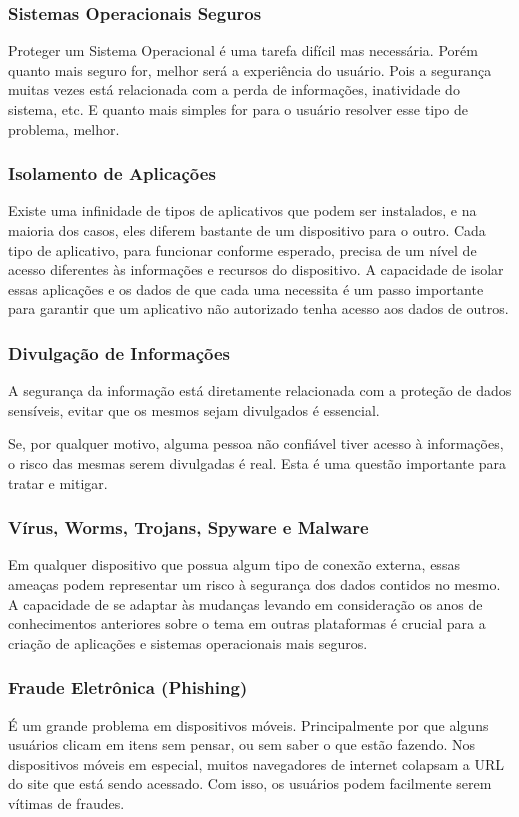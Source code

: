 \subsubsection{Sistemas Operacionais Seguros}
Proteger um Sistema Operacional é uma tarefa difícil mas necessária. Porém quanto mais seguro for, melhor será a experiência do usuário. Pois a segurança muitas vezes está relacionada com a perda de informações, inatividade do sistema, etc. E quanto mais simples for para o usuário resolver esse tipo de problema, melhor. \cite{DWIVEDI}

\subsubsection{ Isolamento de Aplicações}
Existe uma infinidade de tipos de aplicativos que podem ser instalados, e na maioria dos casos, eles diferem bastante de um dispositivo para o outro. Cada tipo de aplicativo, para funcionar conforme esperado, precisa de um nível de acesso diferentes às informações e recursos do dispositivo. A capacidade de isolar essas aplicações e os dados de que cada uma necessita é um passo importante para garantir que um aplicativo não autorizado tenha acesso aos dados de outros. \cite{DWIVEDI}

\subsubsection{Divulgação de Informações}
A segurança da informação está diretamente relacionada com a proteção de dados sensíveis, evitar que os mesmos sejam divulgados é essencial. 

Se, por qualquer motivo, alguma pessoa não confiável tiver acesso à informações, o risco das mesmas serem divulgadas é real. Esta é uma questão importante para tratar e mitigar. \cite{DWIVEDI} 

\subsubsection{Vírus, Worms, Trojans, Spyware e Malware}
Em qualquer dispositivo que possua algum tipo de conexão externa, essas ameaças podem representar um risco à segurança dos dados contidos no mesmo. A capacidade de se adaptar às mudanças levando em consideração os anos de conhecimentos anteriores sobre o tema em outras plataformas é crucial para a criação de aplicações e sistemas operacionais mais seguros. \cite{DWIVEDI} 

\subsubsection{Fraude Eletrônica (Phishing)}
É um grande problema em dispositivos móveis. Principalmente por que alguns usuários clicam em itens sem pensar, ou sem saber o que estão fazendo. Nos dispositivos móveis em especial, muitos navegadores de internet colapsam a URL do site que está sendo acessado. Com isso, os usuários podem facilmente serem vítimas de fraudes. \cite{DWIVEDI}  

